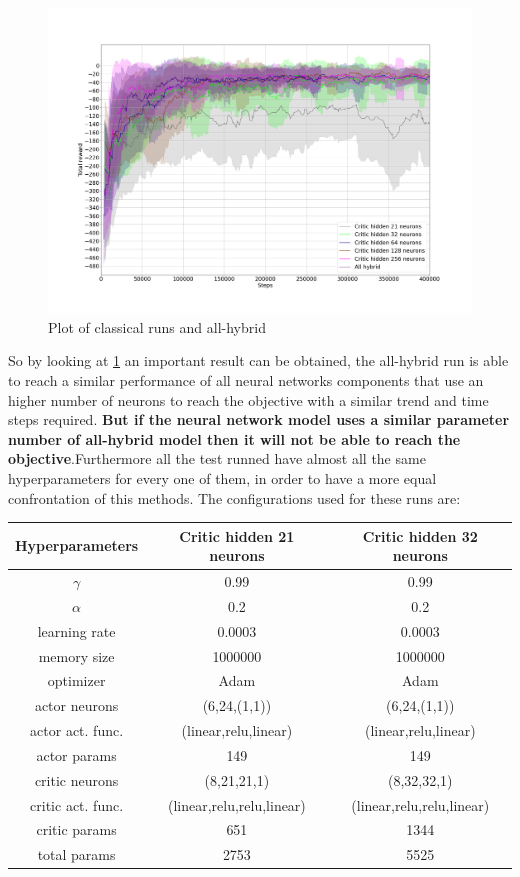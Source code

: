\begin{figure}[H]
	\centering
	\includegraphics[width=0.9\linewidth]{"img/Best classical vs all hybrid results"}
	\caption{Plot of classical runs and all-hybrid}
	\label{fig:best-classical-vs-all-hybrid-results}
\end{figure}
\newpage
So by looking at \ref{fig:best-classical-vs-all-hybrid-results} an important result can be obtained, the all-hybrid run is able to reach a similar performance of all neural networks components that use an higher number of neurons to reach the objective with a similar trend and time steps required. \textbf{But if the neural network model uses a similar parameter number of all-hybrid model then it will not be able to reach the objective}.Furthermore all the test runned have almost all the same hyperparameters for every one of them, in order to have a more equal confrontation of this methods. The configurations used for these runs are:
\newline
\vspace{0.2cm}
\newline
\begin{tabular}{|c|c|c|}
	\hline
	Hyperparameters & Critic hidden 21 neurons & Critic hidden 32 neurons \\
	\hline
	$\gamma$ & 0.99 & 0.99  \\
	\hline
	$\alpha$ & 0.2 & 0.2  \\
	\hline
	learning rate & 0.0003 & 0.0003  \\
	\hline
	memory size & 1000000 & 1000000   \\
	\hline
	optimizer & Adam & Adam  \\
	\hline
	actor neurons & (6,24,(1,1)) & (6,24,(1,1))  \\
	\hline
	actor act. func. & (linear,relu,linear) & (linear,relu,linear) \\
	\hline
	actor params & 149 & 149 \\
	\hline
	critic neurons & (8,21,21,1) & (8,32,32,1)  \\
	\hline
	critic act. func. & (linear,relu,relu,linear) & (linear,relu,relu,linear) \\
	\hline
	critic params & 651 & 1344 \\
	\hline
	total params & 2753 & 5525 \\
	\hline
\end{tabular}
